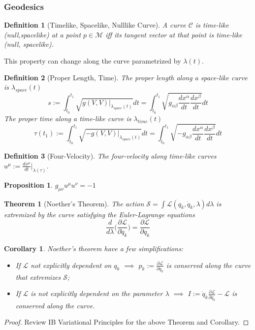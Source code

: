\documentclass[a4paper]{article}
\theoremstyle{new}
\newtheorem{defi}{Definition}[section]
\newtheorem{thm}{Theorem}[section]
\newtheorem{prop}{Proposition}[section]
\newtheorem{cor}{Corollary}[section]
\begin{document}
\subsubsection{Geodesics}
\begin{defi}[Timelike, Spacelike, Nulllike Curve]
A curve $\mathcal{C}$ is time-like (null,spacelike) at a point $p\in\mathcal{M}$ iff its tangent vector at that point is time-like (null, spacelike).
\end{defi}
This property can change along the curve parametrized by $\lambda(t)$.
\begin{defi}[Proper Length, Time]
The proper length along a space-like curve is $\lambda_{space}(t)$
$$s:=\int_{t_0}^{t_1}\sqrt{g(V,V)|_{\lambda_{space}(t)}}dt=\int_{t_0}^{t_1}\sqrt{g_{\alpha\beta}\frac{dx^\alpha}{dt}\frac{dx^\beta}{dt}}dt$$
The proper time along a time-like curve is $\lambda_{time}(t)$
$$\tau(t_1):=\int_{t_0}^{t_1}\sqrt{-g(V,V)|_{\lambda_{space}(t)}}dt=\int_{t_0}^{t_1}\sqrt{-g_{\alpha\beta}\frac{dx^\alpha}{dt}\frac{dx^\beta}{dt}}dt$$
\end{defi}
\begin{defi}[Four-Velocity]
The four-velocity along time-like curves $u^\mu:=\frac{dx^\mu}{dt}|_{\lambda(\tau)}$.
\end{defi}
\begin{prop}
$g_{\mu\nu}u^\mu u^\nu=-1$
\end{prop}
\begin{thm}[Noether's Theorem]
The action $\mathcal{S}=\int\mathcal{L}(q_k,\dot{q}_k,\lambda)d\lambda$ is extremized by the curve satisfying the Euler-Lagrange equations
$$\frac{d}{d\lambda}\bigg(\frac{\partial\mathcal{L}}{\partial\dot{q}_k}\bigg)=\frac{\partial\mathcal{L}}{\partial q_k}$$
\end{thm}
\begin{cor}
Noether's theorem have a few simplifications:
\begin{itemize}
    \item If $\mathcal{L}$ not explicitly dependent on $q_k$ $\implies$ $p_k:=\frac{\partial\mathcal{L}}{\partial\dot{q}_k}$ is conserved along the curve that extremizes $\mathcal{S}$;
    \item If $\mathcal{L}$ is not explicitly dependent on the parameter $\lambda$ $\implies$ $I:=\dot{q}_k\frac{\partial\mathcal{L}}{\partial\dot{q}_k}-\mathcal{L}$ is conserved along the curve. 
\end{itemize}
\end{cor}
\begin{proof}
Review IB Variational Principles for the above Theorem and Corollary.
\end{proof}
\end{document}
